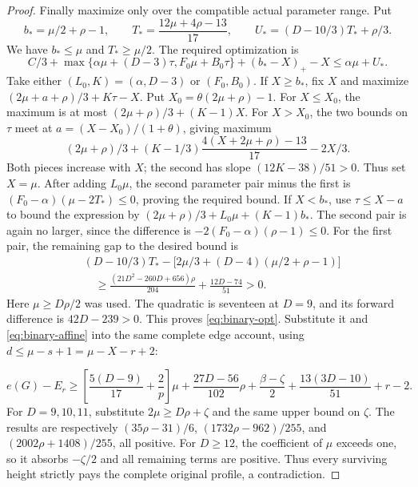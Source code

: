 \documentclass[11pt,a4paper]{article}
\theoremstyle{definition}
\begin{document}
\begin{proof}
Finally maximize only over the compatible actual parameter range. Put
\[
b_*=\mu/2+\rho-1,\qquad
T_*=\frac{12\mu+4\rho-13}{17},\qquad
U_*=(D-10/3)T_*+\rho/3.
\]
We have $b_*\le\mu$ and $T_*\ge\mu/2$.
The required optimization is
\begin{equation}\label{eq:binary-opt}
 C/3+\max\{\alpha\mu+(D-3)\tau,F_0\mu+B_0\tau\}
 +(b_*-X)_+-X\le\alpha\mu+U_*.
\end{equation}
Take either $(L_0,K)=(\alpha,D-3)$ or $(F_0,B_0)$.
If $X\ge b_*$, fix $X$ and maximize
$(2\mu+a+\rho)/3+K\tau-X$.
Put $X_0=\theta(2\mu+\rho)-1$.
For $X\le X_0$, the maximum is at most $(2\mu+\rho)/3+(K-1)X$.
For $X>X_0$, the two bounds on $\tau$ meet at $a=(X-X_0)/(1+\theta)$, giving maximum
\[
 (2\mu+\rho)/3+(K-1/3)\frac{4(X+2\mu+\rho)-13}{17}-2X/3.
\]
Both pieces increase with $X$; the second has slope $(12K-38)/51>0$.
Thus set $X=\mu$.
After adding $L_0\mu$, the second parameter pair minus the first is
$(F_0-\alpha)(\mu-2T_*)\le0$, proving the required bound.
If $X<b_*$, use $\tau\le X-a$ to bound the expression by
$(2\mu+\rho)/3+L_0\mu+(K-1)b_*$.
The second pair is again no larger, since the difference is
$-2(F_0-\alpha)(\rho-1)\le0$.
For the first pair, the remaining gap to the desired bound is
\[
\begin{aligned}
&(D-10/3)T_*-\bigl[2\mu/3+(D-4)(\mu/2+\rho-1)\bigr]\\
&\quad\ge
\frac{(21D^2-260D+656)\rho}{204}+\frac{12D-74}{51}>0.
\end{aligned}
\]
Here $\mu\ge D\rho/2$ was used.
The quadratic is seventeen at $D=9$, and its forward difference is $42D-239>0$.
This proves \eqref{eq:binary-opt}.
Substitute it and \eqref{eq:binary-affine} into the same complete edge account, using
$d\le\mu-s+1=\mu-X-r+2$:

\[
 e(G)-E_r\ge
 \left[\frac{5(D-9)}{17}+\frac2p\right]\mu+
 \frac{27D-56}{102}\rho+\frac{\beta-\zeta}{2}
 +\frac{13(3D-10)}{51}+r-2.
\]
For $D=9,10,11$, substitute $2\mu\ge D\rho+\zeta$ and the same upper bound on $\zeta$.
The results are respectively
$(35\rho-31)/6$,
$(1732\rho-962)/255$, and
$(2002\rho+1408)/255$, all positive.
For $D\ge12$, the coefficient of $\mu$ exceeds one, so it absorbs $-\zeta/2$ and all remaining terms are positive.
Thus every surviving height strictly pays the complete original profile, a contradiction.
\end{proof}
\end{document}
